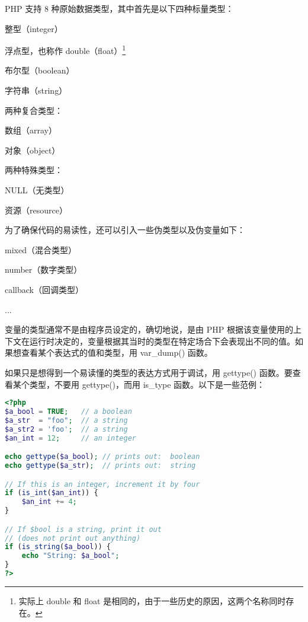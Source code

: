 PHP 支持 8 种原始数据类型，其中首先是以下四种标量类型：

\begin{compactitem}
\item 整型（integer）
\item 浮点型，也称作 double（float）\footnote{实际上 double 和 float 是相同的，由于一些历史的原因，这两个名称同时存在。}
\item 布尔型（boolean）
\item 字符串（string）
\end{compactitem}

两种复合类型：

\begin{compactitem}
\item 数组（array）
\item 对象（object）
\end{compactitem}

两种特殊类型：


\begin{compactitem}
\item NULL（无类型）
\item 资源（resource）
\end{compactitem}

为了确保代码的易读性，还可以引入一些伪类型以及伪变量如下：

\begin{compactitem}
\item mixed（混合类型）
\item number（数字类型）
\item callback（回调类型）
\item ...
\end{compactitem}

变量的类型通常不是由程序员设定的，确切地说，是由 PHP 根据该变量使用的上下文在运行时决定的，变量根据其当时的类型在特定场合下会表现出不同的值。如果想查看某个表达式的值和类型，用 var\_dump() 函数。

如果只是想得到一个易读懂的类型的表达方式用于调试，用 gettype() 函数。要查看某个类型，不要用 gettype()，而用 is\_type 函数。以下是一些范例：

\begin{lstlisting}[language=PHP]
<?php
$a_bool = TRUE;   // a boolean
$a_str  = "foo";  // a string
$a_str2 = 'foo';  // a string
$an_int = 12;     // an integer

echo gettype($a_bool); // prints out:  boolean
echo gettype($a_str);  // prints out:  string

// If this is an integer, increment it by four
if (is_int($an_int)) {
    $an_int += 4;
}

// If $bool is a string, print it out
// (does not print out anything)
if (is_string($a_bool)) {
    echo "String: $a_bool";
}
?>
\end{lstlisting}


